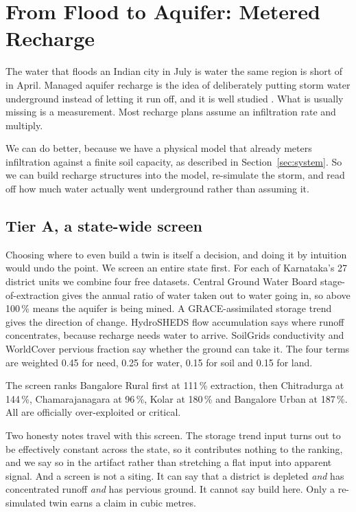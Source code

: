 \section{From Flood to Aquifer: Metered Recharge}
\label{sec:recharge}

The water that floods an Indian city in July is water the same region is short of in April. Managed
aquifer recharge is the idea of deliberately putting storm water underground instead of letting it
run off, and it is well studied \cite{mar2026, pavelic2015utfi}. What is usually missing is a
measurement. Most recharge plans assume an infiltration rate and multiply.

We can do better, because we have a physical model that already meters infiltration against a finite
soil capacity, as described in Section~\ref{sec:system}. So we can build recharge structures into the
model, re-simulate the storm, and read off how much water actually went underground rather than
assuming it.

\subsection{Tier A, a state-wide screen}
Choosing where to even build a twin is itself a decision, and doing it by intuition would undo the
point. We screen an entire state first. For each of Karnataka's 27 district units we combine four
free datasets. Central Ground Water Board stage-of-extraction gives the annual ratio of water taken
out to water going in, so above 100\,\% means the aquifer is being mined. A GRACE-assimilated
storage trend gives the direction of change. HydroSHEDS flow accumulation says where runoff
concentrates, because recharge needs water to arrive. SoilGrids conductivity and WorldCover
pervious fraction say whether the ground can take it. The four terms are weighted 0.45 for need,
0.25 for water, 0.15 for soil and 0.15 for land.

The screen ranks Bangalore Rural first at 111\,\% extraction, then Chitradurga at 144\,\%,
Chamarajanagara at 96\,\%, Kolar at 180\,\% and Bangalore Urban at 187\,\%. All are officially
over-exploited or critical.

Two honesty notes travel with this screen. The storage trend input turns out to be effectively
constant across the state, so it contributes nothing to the ranking, and we say so in the artifact
rather than stretching a flat input into apparent signal. And a screen is not a siting. It can say
that a district is depleted \emph{and} has concentrated runoff \emph{and} has pervious ground. It
cannot say build here. Only a re-simulated twin earns a claim in cubic metres.

